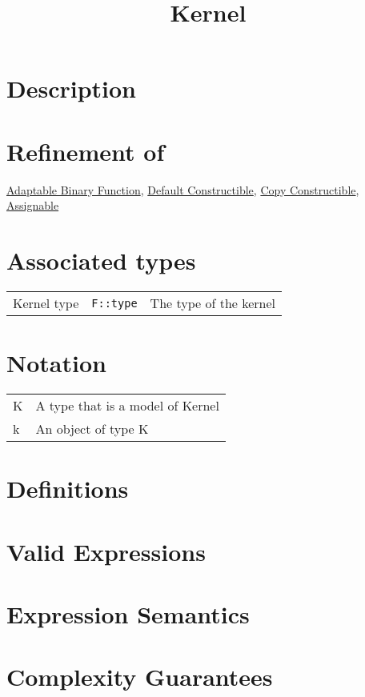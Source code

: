 \documentclass{article}
\begin{document}
\title{Kernel}
\maketitle


\section*{Description}
\section*{Refinement of}

\href{http://www.sgi.com/tech/stl/AdaptableBinaryFunction.html}{Adaptable Binary Function}, 
\href{http://www.sgi.com/tech/stl/DefaultConstructible.html}{Default Constructible}, 
\href{http://www.boost.org/doc/html/CopyConstructible.html}{Copy Constructible},
\href{http://www.sgi.com/tech/stl/Assignable.html}{Assignable}

\section*{Associated types}

\begin{tabular}{lll}
Kernel type & \texttt{F::type} & The type of the kernel \\
\end{tabular}

\section*{Notation}
\begin{tabular}{ll}
K & A type that is a model of Kernel \\
k & An object of type K \\
\end{tabular}

\section*{Definitions}
\section*{Valid Expressions}
\section*{Expression Semantics}

\section*{Complexity Guarantees}
\end{document}
